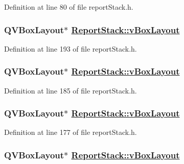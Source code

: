 Definition at line 80 of file report\-Stack.h.\hypertarget{classReportStack_r107}{
\subsubsection[vBoxLayout]{\setlength{\rightskip}{0pt plus 5cm}QVBox\-Layout$\ast$ \hyperlink{classReportStack_r13}{Report\-Stack::v\-Box\-Layout}}}
\label{classReportStack_r107}


Definition at line 193 of file report\-Stack.h.\hypertarget{classReportStack_r101}{
\subsubsection[vBoxLayout]{\setlength{\rightskip}{0pt plus 5cm}QVBox\-Layout$\ast$ \hyperlink{classReportStack_r13}{Report\-Stack::v\-Box\-Layout}}}
\label{classReportStack_r101}


Definition at line 185 of file report\-Stack.h.\hypertarget{classReportStack_r95}{
\subsubsection[vBoxLayout]{\setlength{\rightskip}{0pt plus 5cm}QVBox\-Layout$\ast$ \hyperlink{classReportStack_r13}{Report\-Stack::v\-Box\-Layout}}}
\label{classReportStack_r95}


Definition at line 177 of file report\-Stack.h.\hypertarget{classReportStack_r81}{
\subsubsection[vBoxLayout]{\setlength{\rightskip}{0pt plus 5cm}QVBox\-Layout$\ast$ \hyperlink{classReportStack_r13}{Report\-Stack::v\-Box\-Layout}}}
\label{classReportStack_r81}


